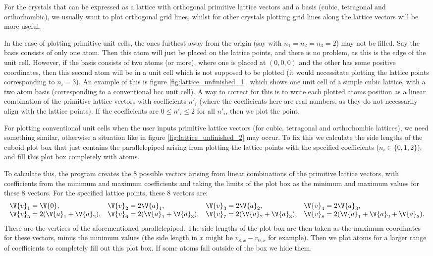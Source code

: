 \documentclass[main.tex]{subfiles}
\begin{document}
	For the crystals that can be expressed as a lattice with orthogonal primitive lattice vectors and a basis (cubic, tetragonal and orthorhombic), we usually want to plot orthogonal grid lines, whilst for other crystals plotting grid lines along the lattice vectors will be more useful.
	
	In the case of plotting primitive unit cells, the ones furthest away from the origin (say with $ n_1 = n_2 = n_3 = 2 $) may not be filled. Say the basis consists of only one atom. Then this atom will just be placed on the lattice points, and there is no problem, as this is the edge of the unit cell. However, if the basis consists of two atoms (or more), where one is placed at $ (0,0,0) $ and the other has some positive coordinates, then this second atom will be in a unit cell which is not supposed to be plotted (it would necessitate plotting the lattice points corresponding to $ n_i = 3 $). An example of this is figure \ref{fig:lattice_unfinished_1}, which shows one unit cell of a simple cubic lattice, with a two atom basis (corresponding to a conventional bcc unit cell). A way to correct for this is to write each plotted atoms position as a linear combination of the primitive lattice vectors with coefficients $ n'_i $ (where the coefficients here are real numbers, as they do not necessarily align with the lattice points). If the coefficients are $ 0 \leq n'_i \leq 2 $ for all $ n'_i $, then we plot the point.
	
	For plotting conventional unit cells when the user inputs primitive lattice vectors (for cubic, tetragonal and orthorhombic lattices), we need something similar, otherwise a situation like in figure \ref{fig:lattice_unfinished_2} may occur. To fix this we calculate the side lengths of the cuboid plot box that just contains the parallelepiped arising from plotting the lattice points with the specified coefficients ($ n_i \in \{0, 1, 2\}$), and fill this plot box completely with atoms.
	
	To calculate this, the program creates the 8 possible vectors arising from linear combinations of the primitive lattice vectors, with coefficients from the minimum and maximum coefficients and taking the limits of the plot box as the minimum and maximum values for these 8 vectors. For the specified lattice points, these 8 vectors are:
	\begin{equation}
		\begin{array}{llll}
			\V{v}_1 = \V{0}, & \V{v}_2 = 2\V{a}_1, & \V{v}_3 = 2\V{a}_2, & \V{v}_4 = 2\V{a}_3, \\
			\V{v}_5 = 2(\V{a}_1+\V{a}_2), & \V{v}_6 = 2(\V{a}_1+\V{a}_3), & \V{v}_7 = 2(\V{a}_2+\V{a}_3), &\V{v}_8 = 2(\V{a}_1+\V{a}_2+ \V{a}_3).
		\end{array}
	\end{equation}
	These are the vertices of the aforementioned parallelepiped. The side lengths of the plot box are then taken as the maximum coordinates for these vectors, minus the minimum values (the side length in $ x $ might be $ v_{8,x}-v_{0,x} $ for example). Then we plot atoms for a larger range of coefficients to completely fill out this plot box. If some atoms fall outside of the box we hide them.
	
\end{document}
